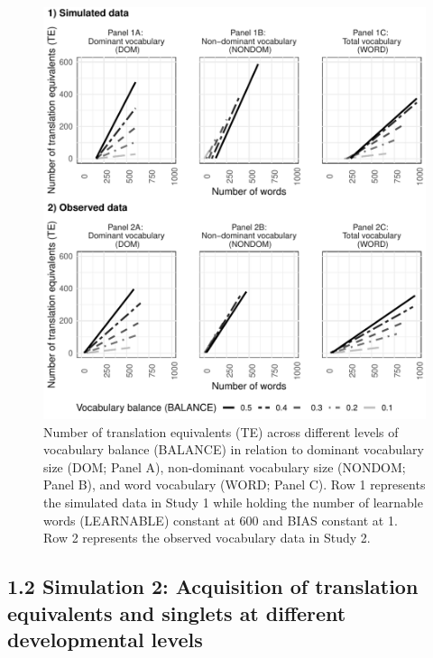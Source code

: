 \documentclass[
  english,
  ,man,floatsintext]{apa6}
\begin{document}
\begin{figure}[H]

{\centering \includegraphics[width=1.1\linewidth,height=0.8\textheight]{paper_TE_bilingual_vocabulary_model_files/figure-latex/fig2-1} 

}

\caption{Number of translation equivalents (TE) across different levels of vocabulary balance (BALANCE) in relation to dominant vocabulary size (DOM; Panel A), non-dominant vocabulary size (NONDOM; Panel B), and word vocabulary (WORD; Panel C). Row 1 represents the simulated data in Study 1 while holding the number of learnable words (LEARNABLE) constant at 600 and BIAS constant at 1. Row 2 represents the observed vocabulary data in Study 2.}\label{fig:fig2}
\end{figure}

\hypertarget{simulation-2-acquisition-of-translation-equivalents-and-singlets-at-different-developmental-levels}{%
\subsection{1.2 Simulation 2: Acquisition of translation equivalents and singlets at different developmental levels}\label{simulation-2-acquisition-of-translation-equivalents-and-singlets-at-different-developmental-levels}}
\end{document}

